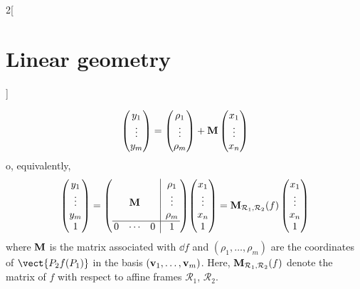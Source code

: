 \documentclass[../../../main.tex]{subfiles}
\begin{document}
\begin{multicols}{2}[\section{Linear geometry}]
\begin{prop}
        $$
            \begin{pmatrix}
                y_1    \\
                \vdots \\
                y_m    \\
            \end{pmatrix}
            =
            \begin{pmatrix}
                \rho_1 \\
                \vdots \\
                \rho_m \\
            \end{pmatrix}
            +\vb{M}
            \begin{pmatrix}
                x_1    \\
                \vdots \\
                x_n    \\
            \end{pmatrix}$$
        o, equivalently,
        $$
            \begin{pmatrix}
                y_1    \\
                \vdots \\
                y_m    \\
                1      \\
            \end{pmatrix}
            =\left(
            \begin{array}{@{\,}ccc|c@{\,}}
                      &               &   & \rho_1 \\
                      & \mathblack{M} &   & \vdots \\
                      &               &   & \rho_m \\
                    \hline
                    0 & \cdots        & 0 & 1
                \end{array}\right)\!
            \begin{pmatrix}
                x_1    \\
                \vdots \\
                x_n    \\
                1      \\
            \end{pmatrix}
            =\mathblack{M}_{\mathcal{R}_1,\mathcal{R}_2}(f)
            \begin{pmatrix}
                x_1    \\
                \vdots \\
                x_n    \\
                1      \\
            \end{pmatrix}$$
        where $\vb{M}$ is the matrix associated with $\dd f$ and $(\rho_1,\ldots,\rho_m)$ are the coordinates of $\vect{P_2f(P_1)}$ in the basis $(\vb{v}_1,\ldots,\vb{v}_m)$. Here, $\vb{M}_{\mathcal{R}_1,\mathcal{R}_2}(f)$ denote the matrix of $f$ with respect to affine frames $\mathcal{R}_1$, $\mathcal{R}_2$.
    \end{prop}

\end{multicols}
\end{document}
